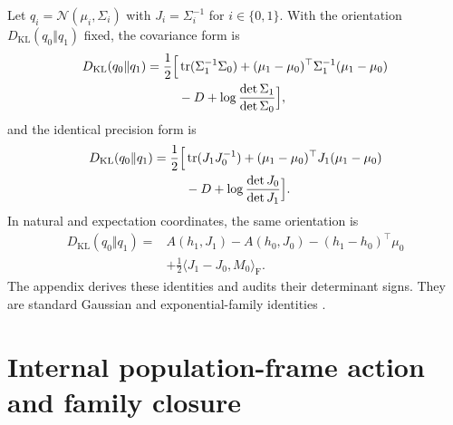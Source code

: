 Let $q_i=\mathcal N(\mu_i,\Sigma_i)$ with $J_i=\Sigma_i^{-1}$ for $i\in\{0,1\}$.  With the orientation $D_{\mathrm{KL}}(q_0\Vert q_1)$ fixed, the covariance form is
\begin{equation}
\begin{aligned}
D_{\mathrm{KL}}(q_0\Vert q_1)
=\frac12\Bigl[
&\operatorname{tr}(\Sigma_1^{-1}\Sigma_0)
+(\mu_1-\mu_0)^\top
\Sigma_1^{-1}(\mu_1-\mu_0)\\
&-D+\log\frac{\det\Sigma_1}{\det\Sigma_0}
\Bigr],
\end{aligned}
\label{eq:gaussian-kl-covariance-form}
\end{equation}
and the identical precision form is
\begin{equation}
\begin{aligned}
D_{\mathrm{KL}}(q_0\Vert q_1)
=\frac12\Bigl[
&\operatorname{tr}(J_1J_0^{-1})
+(\mu_1-\mu_0)^\top J_1(\mu_1-\mu_0)\\
&-D+\log\frac{\det J_0}{\det J_1}
\Bigr].
\end{aligned}
\label{eq:gaussian-kl-precision-form}
\end{equation}
In natural and expectation coordinates, the same orientation is
\begin{equation}
\begin{aligned}
D_{\mathrm{KL}}(q_0\Vert q_1)
={}&A(h_1,J_1)-A(h_0,J_0)
-(h_1-h_0)^\top\mu_0\\
&+\frac12\langle J_1-J_0,M_0\rangle_{\mathrm F}.
\end{aligned}
\label{eq:gaussian-kl-natural-expectation-form}
\end{equation}
The appendix derives these identities and audits their determinant signs.  They are standard Gaussian and exponential-family identities \citep{Kullback1951,petersen2012matrix,Wainwright2008}.

\section{Internal population-frame action and family closure}

